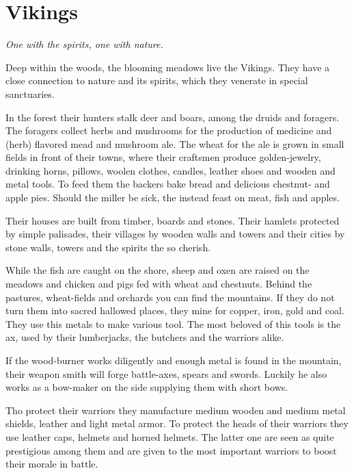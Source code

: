 \section{\Gls{Vikings}}

\begin{flushright}
	\emph{One with the spirits, one with nature.}
\end{flushright}

Deep within the woods, the blooming meadows live the \gls{Vikings}. They have a
close connection to nature and its spirits, which they venerate in special
sanctuaries.

In the forest their hunters stalk deer and boars, among the druids and
foragers. The foragers collect herbs and mushrooms for the production of
medicine and (herb) flavored mead and mushroom ale. The wheat for the ale is
grown in small fields in front of their towns, where their craftsmen produce
golden-jewelry, drinking horns, pillows, woolen clothes, candles, leather shoes
and wooden and metal tools. To feed them the backers bake bread and delicious
chestnut- and apple pies. Should the miller be sick, the instead feast on meat,
fish and apples.

Their houses are built from timber, boards and stones. Their hamlets protected
by simple palisades, their villages by wooden walls and towers and their cities
by stone walls, towers and the spirits the so cherish.

While the fish are caught on the shore, sheep and oxen are raised on the
meadows and chicken and pigs fed with wheat and chestnuts. Behind the pastures,
wheat-fields and orchards you can find the mountains. If they do not turn them
into sacred hallowed places, they mine for copper, iron, gold and coal. They
use this metals to make various tool. The most beloved of this tools is the ax,
used by their lumberjacks, the butchers and the warriors alike.

If the wood-burner works diligently and enough metal is found in the mountain,
their weapon smith will forge battle-axes, spears and swords. Luckily he also
works as a bow-maker on the side supplying them with short bows.

Tho protect their warriors they manufacture medium wooden and medium metal
shields, leather and light metal armor. To protect the heads of their warriors
they use leather caps, helmets and horned helmets. The latter one are seen as
quite prestigious among them and are given to the most important warriors to
boost their morale in battle.

